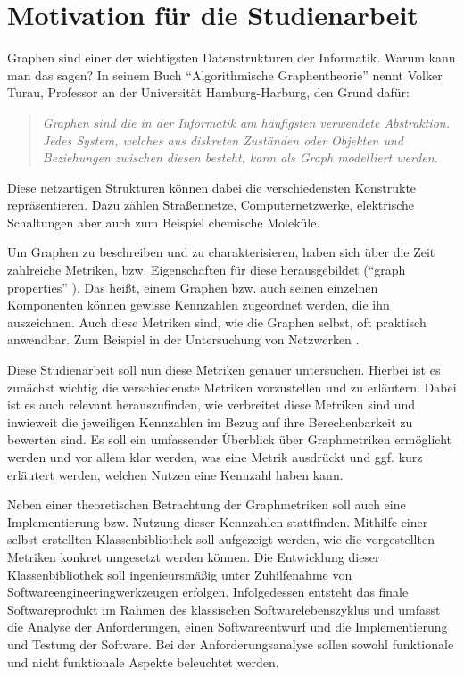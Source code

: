 \documentclass[a4paper,12pt,ngerman,chapterprefix=false,listof=totoc,bibliography=totoc]{scrreprt}
\newcommand{\zitat}[2]{
	\begin{quote}
		\textit{#1} \cite{#2}
	\end{quote}
}
\begin{document}
\section{Motivation für die Studienarbeit}{
Graphen sind einer der wichtigsten Datenstrukturen der Informatik. Warum kann man das sagen? In seinem Buch "`Algorithmische Graphentheorie"' nennt Volker Turau, Professor an der Universität Hamburg-Harburg, den Grund dafür: 
\zitat{Graphen sind die in der Informatik am häufigsten verwendete Abstraktion. Jedes System, welches aus diskreten Zuständen oder Objekten und Beziehungen zwischen diesen besteht, kann als Graph modelliert werden.}{turau_algorithmische_2004}
Diese netzartigen Strukturen können dabei die verschiedensten Konstrukte repräsentieren. Dazu zählen Straßennetze, Computernetzwerke, elektrische Schaltungen aber auch zum Beispiel chemische Moleküle. \cite{tittmann_graphentheorie_2019}

Um Graphen zu beschreiben und zu charakterisieren, haben sich über die Zeit zahlreiche Metriken, bzw. Eigenschaften für diese herausgebildet ("`graph properties"' \cite{lovasz_large_2012}). Das heißt, einem Graphen bzw. auch seinen einzelnen Komponenten können gewisse Kennzahlen zugeordnet werden, die ihn auszeichnen. Auch diese Metriken sind, wie die Graphen selbst, oft praktisch anwendbar. Zum Beispiel in der Untersuchung von Netzwerken \cite{ellens_graph_2013}.

Diese Studienarbeit soll nun diese Metriken genauer untersuchen. Hierbei ist es zunächst wichtig die verschiedenste Metriken vorzustellen und zu erläutern. Dabei ist es auch relevant herauszufinden, wie verbreitet diese Metriken sind und inwieweit die jeweiligen Kennzahlen im Bezug auf ihre Berechenbarkeit zu bewerten sind. Es soll ein umfassender Überblick über Graphmetriken ermöglicht werden und vor allem klar werden, was eine Metrik ausdrückt und ggf. kurz erläutert werden, welchen Nutzen eine Kennzahl haben kann.

Neben einer theoretischen Betrachtung der Graphmetriken soll auch eine Implementierung bzw. Nutzung dieser Kennzahlen stattfinden. Mithilfe einer selbst erstellten Klassenbibliothek soll aufgezeigt werden, wie die vorgestellten Metriken konkret umgesetzt werden können. Die Entwicklung dieser Klassenbibliothek soll ingenieursmäßig unter Zuhilfenahme von Softwareengineeringwerkzeugen erfolgen. Infolgedessen entsteht das finale Softwareprodukt im Rahmen des klassischen Softwarelebenszyklus und umfasst die Analyse der Anforderungen, einen Softwareentwurf und die Implementierung und Testung der Software. Bei der Anforderungsanalyse sollen sowohl funktionale und nicht funktionale Aspekte beleuchtet werden. \cite{balzert_lehrbuch_2009,balzert_lehrbuch_2011}

}
\end{document}
